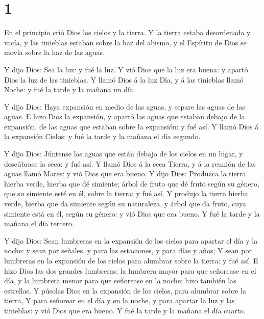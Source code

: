 \hypertarget{section}{%
\section{1}\label{section}}

 En el principio crió Dios los cielos y la tierra.
 Y la tierra estaba desordenada y vacía, y las tinieblas
estaban sobre la haz del abismo, y el Espíritu de Dios se movía sobre la
haz de las aguas.

 Y dijo Dios: Sea la luz: y fué la luz.  Y vió
Dios que la luz era buena: y apartó Dios la luz de las tinieblas.
 Y llamó Dios á la luz Día, y á las tinieblas llamó Noche: y
fué la tarde y la mañana un día.

 Y dijo Dios: Haya expansión en medio de las aguas, y separe
las aguas de las aguas.  E hizo Dios la expansión, y apartó
las aguas que estaban debajo de la expansión, de las aguas que estaban
sobre la expansión: y fué así.  Y llamó Dios á la expansión
Cielos: y fué la tarde y la mañana el día segundo.

 Y dijo Dios: Júntense las aguas que están debajo de los
cielos en un lugar, y descúbrase la seca: y fué así.  Y
llamó Dios á la seca Tierra, y á la reunión de las aguas llamó Mares: y
vió Dios que era bueno.  Y dijo Dios: Produzca la tierra
hierba verde, hierba que dé simiente; árbol de fruto que dé fruto según
su género, que su simiente esté en él, sobre la tierra: y fué así.
 Y produjo la tierra hierba verde, hierba que da simiente
según su naturaleza, y árbol que da fruto, cuya simiente está en él,
según su género: y vió Dios que era bueno.  Y fué la tarde
y la mañana el día tercero.

 Y dijo Dios: Sean lumbreras en la expansión de los cielos
para apartar el día y la noche: y sean por señales, y para las
estaciones, y para días y años;  Y sean por lumbreras en la
expansión de los cielos para alumbrar sobre la tierra: y fué así.
 E hizo Dios las dos grandes lumbreras; la lumbrera mayor
para que señorease en el día, y la lumbrera menor para que señorease en
la noche: hizo también las estrellas.  Y púsolas Dios en la
expansión de los cielos, para alumbrar sobre la tierra,  Y
para señorear en el día y en la noche, y para apartar la luz y las
tinieblas: y vió Dios que era bueno.  Y fué la tarde y la
mañana el día cuarto.

